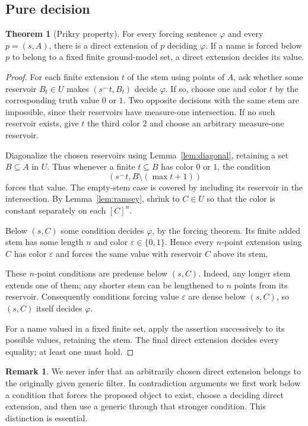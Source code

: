 \documentclass[11pt,letterpaper]{article}
\theoremstyle{definition}
\newtheorem{theorem}[definition]{Theorem}
\newtheorem{remark}[definition]{Remark}
\numberwithin{equation}{section}
\newcommand{\concat}{\mathbin{{}^{\frown}}}
\begin{document}
\subsection{Pure decision}

\begin{theorem}[Prikry property]\label{thm:prikry}
For every forcing sentence $\varphi$ and every $p=(s,A)$, there is a direct extension of $p$ deciding $\varphi$. If a name is forced below $p$ to belong to a fixed finite ground-model set, a direct extension decides its value.
\end{theorem}

\begin{proof}
For each finite extension $t$ of the stem using points of $A$, ask whether some reservoir $B_t\in U$ makes $(s\concat t,B_t)$ decide $\varphi$. If so, choose one and color $t$ by the corresponding truth value $0$ or $1$. Two opposite decisions with the same stem are impossible, since their reservoirs have measure-one intersection. If no such reservoir exists, give $t$ the third color $2$ and choose an arbitrary measure-one reservoir.

Diagonalize the chosen reservoirs using Lemma~\ref{lem:diagonal}, retaining a set $B\subseteq A$ in $U$. Thus whenever a finite $t\subseteq B$ has color $0$ or $1$, the condition
\[
 (s\concat t,B\setminus(\max t+1))
\]
forces that value. The empty-stem case is covered by including its reservoir in the intersection. By Lemma~\ref{lem:ramsey}, shrink to $C\in U$ so that the color is constant separately on each $[C]^n$.

Below $(s,C)$ some condition decides $\varphi$, by the forcing theorem. Its finite added stem has some length $n$ and color $\varepsilon\in\{0,1\}$. Hence every $n$-point extension using $C$ has color $\varepsilon$ and forces the same value with reservoir $C$ above its stem.

These $n$-point conditions are predense below $(s,C)$. Indeed, any longer stem extends one of them; any shorter stem can be lengthened to $n$ points from its reservoir. Consequently conditions forcing value $\varepsilon$ are dense below $(s,C)$, so $(s,C)$ itself decides $\varphi$.

For a name valued in a fixed finite set, apply the assertion successively to its possible values, retaining the stem. The final direct extension decides every equality; at least one must hold.
\end{proof}

\begin{remark}
We never infer that an arbitrarily chosen direct extension belongs to the originally given generic filter. In contradiction arguments we first work below a condition that forces the proposed object to exist, choose a deciding direct extension, and then use a generic through that stronger condition. This distinction is essential.
\end{remark}
\end{document}
